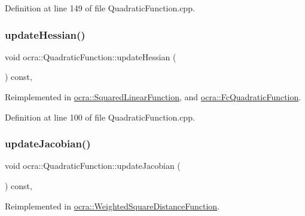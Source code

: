 Definition at line 149 of file Quadratic\+Function.\+cpp.

\hypertarget{classocra_1_1QuadraticFunction_a342ea525685ddc2c414a49e7480a7a4c}{}\label{classocra_1_1QuadraticFunction_a342ea525685ddc2c414a49e7480a7a4c} 
\subsubsection{\texorpdfstring{update\+Hessian()}{updateHessian()}}
{\footnotesize\ttfamily void ocra\+::\+Quadratic\+Function\+::update\+Hessian (\begin{DoxyParamCaption}{ }\end{DoxyParamCaption}) const\hspace{0.3cm}{\ttfamily [protected]}, {\ttfamily [virtual]}}



Reimplemented in \hyperlink{classocra_1_1SquaredLinearFunction_a194606ccd86f17dbc73a6c3bdf2455c9}{ocra\+::\+Squared\+Linear\+Function}, and \hyperlink{classocra_1_1FcQuadraticFunction_aef068bc86027f29c0fbfaa9d53441cd4}{ocra\+::\+Fc\+Quadratic\+Function}.



Definition at line 100 of file Quadratic\+Function.\+cpp.

\hypertarget{classocra_1_1QuadraticFunction_ad8fb5839a78b8ffb201e8ec5bb42cd70}{}\label{classocra_1_1QuadraticFunction_ad8fb5839a78b8ffb201e8ec5bb42cd70} 
\subsubsection{\texorpdfstring{update\+Jacobian()}{updateJacobian()}}
{\footnotesize\ttfamily void ocra\+::\+Quadratic\+Function\+::update\+Jacobian (\begin{DoxyParamCaption}{ }\end{DoxyParamCaption}) const\hspace{0.3cm}{\ttfamily [protected]}, {\ttfamily [virtual]}}



Reimplemented in \hyperlink{classocra_1_1WeightedSquareDistanceFunction_adb2aad2190e474c2975a5544f0122585}{ocra\+::\+Weighted\+Square\+Distance\+Function}.



